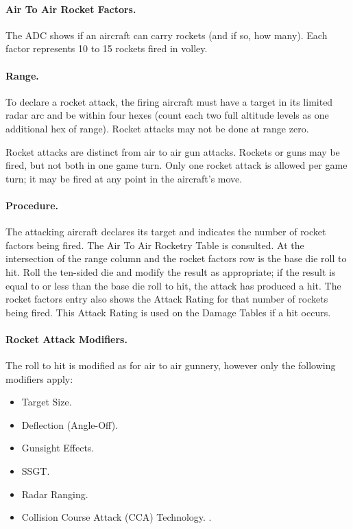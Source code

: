 \paragraph{Air To Air Rocket Factors.} The ADC shows if an aircraft can carry rockets (and if so, how many). Each factor represents 10 to 15 rockets fired in volley.

\paragraph{Range.} To declare a rocket attack, the firing aircraft must have a target in its limited radar arc and be within four hexes (count each two full altitude levels as one additional hex of range). Rocket attacks may not be done at range zero.

Rocket attacks are distinct from air to air gun attacks. Rockets or guns may be fired, but not both in one game turn. Only one rocket attack is allowed per game turn; it may be fired at any point in the aircraft's move.

\paragraph{Procedure.} The attacking aircraft declares its target and indicates the number of rocket factors being fired. The Air To Air Rocketry Table is consulted. At the intersection of the range column and the rocket factors row is the base die roll to hit. Roll the ten-sided die and modify the result as appropriate; if the result is equal to or less than the base die roll to hit, the attack has produced a hit. The rocket factors entry also shows the Attack Rating for that number of rockets being fired. This Attack Rating is used on the Damage Tables if a hit occurs.

\paragraph{Rocket Attack Modifiers.} The roll to hit is modified as for air to air gunnery, however only the following modifiers apply:

\begin{itemize}
    \item Target Size.
    \item Deflection (Angle-Off).
    \item Gunsight Effects.
    \item SSGT.
    \item Radar Ranging.
    \item Collision Course Attack (CCA) Technology.
    .
\end{itemize}

